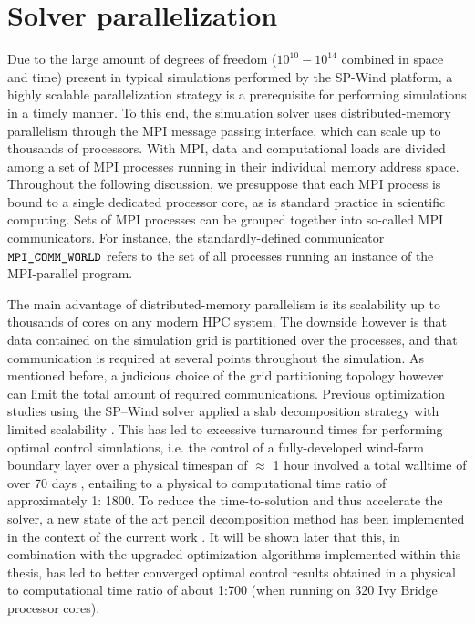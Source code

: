 \section{Solver parallelization}\label{sec:meth_par}
Due to the large amount of degrees of freedom ($10^{10} - 10^{14}$ combined in space and time) present in typical simulations performed by the SP-Wind platform, a highly scalable parallelization strategy is a prerequisite for performing simulations in a timely manner. To this end, the simulation solver uses distributed-memory parallelism through the MPI message passing interface, which can scale up to thousands of processors. With MPI, data and computational loads are divided among a set of MPI processes running in their individual memory address space. Throughout the following discussion, we presuppose that each MPI process is bound to a single dedicated processor core, as is standard practice in scientific computing. Sets of MPI processes can be grouped together into so-called MPI communicators. For instance, the standardly-defined communicator $\verb|MPI_COMM_WORLD|$ refers to the set of all processes running an instance of the MPI-parallel program.

The main advantage of distributed-memory parallelism is its scalability up to thousands of cores on any modern HPC system. The downside however is
that data contained on the simulation grid is partitioned over the processes, and that communication is required at several points throughout the
simulation. As mentioned before, a judicious choice of the grid partitioning topology however can limit the total amount of required communications.
Previous optimization studies using the SP--Wind solver applied a slab decomposition strategy with limited scalability \citep{delport2009constrained,
goit2015optimal}. This has led to excessive turnaround times for performing optimal control simulations, i.e. the control of a fully-developed
wind-farm boundary layer over a physical timespan of $\approx$ 1 hour involved a total walltime of over 70 days \citep{goit2015optimal}, entailing to
a physical to computational time ratio of approximately 1: 1800. To reduce the time-to-solution and thus accelerate the solver, a new state of the art
pencil decomposition method has been implemented in the context of the current work \citep{li20102decomp}. It will be shown later that this, in
combination with the upgraded optimization algorithms implemented within this thesis, has led to better converged optimal control results obtained in
a physical to computational time ratio of about 1:700 (when running on 320 Ivy Bridge processor cores).

